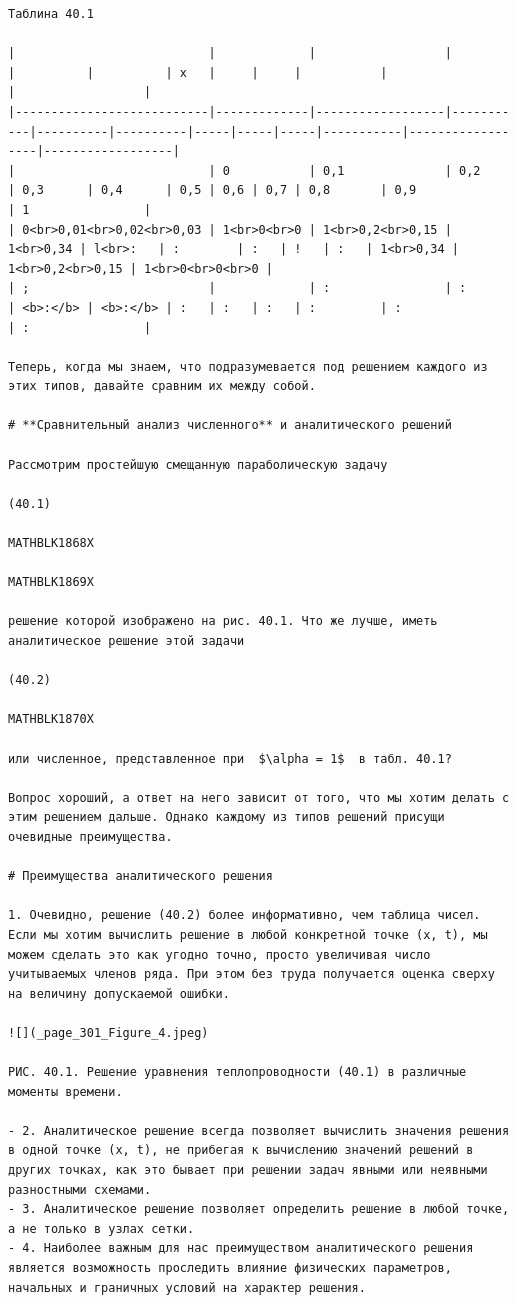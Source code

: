 \documentclass[
]{article}
\begin{document}
\begin{verbatim}
Таблина 40.1

|                           |             |                  |           |          |          | х   |     |     |           |                  |                  |
|---------------------------|-------------|------------------|-----------|----------|----------|-----|-----|-----|-----------|------------------|------------------|
|                           | 0           | 0,1              | 0,2       | 0,3      | 0,4      | 0,5 | 0,6 | 0,7 | 0,8       | 0,9              | 1                |
| 0<br>0,01<br>0,02<br>0,03 | 1<br>0<br>0 | 1<br>0,2<br>0,15 | 1<br>0,34 | l<br>:   | :        | :   | !   | :   | 1<br>0,34 | 1<br>0,2<br>0,15 | 1<br>0<br>0<br>0 |
| ;                         |             | :                | :         | <b>:</b> | <b>:</b> | :   | :   | :   | :         | :                | :                |

Теперь, когда мы знаем, что подразумевается под решением каждого из этих типов, давайте сравним их между собой.

# **Сравнительный анализ численного** и аналитического решений

Рассмотрим простейшую смещанную параболическую задачу

(40.1) 

MATHBLK1868X

MATHBLK1869X

решение которой изображено на рис. 40.1. Что же лучше, иметь аналитическое решение этой задачи

(40.2) 

MATHBLK1870X

или численное, представленное при  $\alpha = 1$  в табл. 40.1?

Вопрос хороший, а ответ на него зависит от того, что мы хотим делать с этим решением дальше. Однако каждому из типов решений присущи очевидные преимущества.

# Преимущества аналитического решения

1. Очевидно, решение (40.2) более информативно, чем таблица чисел. Если мы хотим вычислить решение в любой конкретной точке (x, t), мы можем сделать это как угодно точно, просто увеличивая число учитываемых членов ряда. При этом без труда получается оценка сверху на величину допускаемой ошибки.

![](_page_301_Figure_4.jpeg)

РИС. 40.1. Решение уравнения теплопроводности (40.1) в различные моменты времени.

- 2. Аналитическое решение всегда позволяет вычислить значения решения в одной точке (x, t), не прибегая к вычислению значений решений в других точках, как это бывает при решении задач явными или неявными разностными схемами.
- 3. Аналитическое решение позволяет определить решение в любой точке, а не только в узлах сетки.
- 4. Наиболее важным для нас преимуществом аналитического решения является возможность проследить влияние физических параметров, начальных и граничных условий на характер решения.


\end{verbatim}
\end{document}
